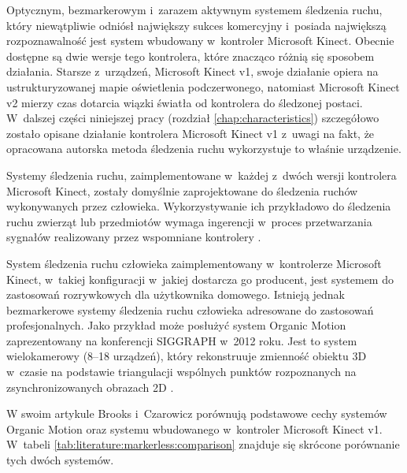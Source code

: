 Optycznym, bezmarkerowym i~zarazem aktywnym systemem śledzenia ruchu, który niewątpliwie odniósł największy sukces komercyjny i~posiada największą rozpoznawalność jest system wbudowany w~kontroler Microsoft Kinect. Obecnie dostępne są dwie wersje tego kontrolera, które znacząco różnią się sposobem działania. Starsze z~urządzeń, Microsoft Kinect v1, swoje działanie opiera na ustrukturyzowanej mapie oświetlenia podczerwonego, natomiast Microsoft Kinect v2 mierzy czas dotarcia wiązki światła od kontrolera do śledzonej postaci. W~dalszej części niniejszej pracy (rozdział \ref{chap:characteristics}) szczegółowo zostało opisane działanie kontrolera Microsoft Kinect v1 z~uwagi na fakt, że opracowana autorska metoda śledzenia ruchu wykorzystuje to właśnie urządzenie. 

Systemy śledzenia ruchu, zaimplementowane w~każdej z~dwóch wersji kontrolera Microsoft Kinect, zostały domyślnie zaprojektowane do śledzenia ruchów wykonywanych przez człowieka. Wykorzystywanie ich przykładowo do śledzenia ruchu zwierząt lub przedmiotów wymaga ingerencji w~proces przetwarzania sygnałów realizowany przez wspomniane kontrolery \cite{Nirjon2012}.

System śledzenia ruchu człowieka zaimplementowany w~kontrolerze Microsoft Kinect, w~takiej konfiguracji w~jakiej dostarcza go producent, jest systemem do zastosowań rozrywkowych dla użytkownika domowego. Istnieją jednak bezmarkerowe systemy śledzenia ruchu człowieka adresowane do zastosowań profesjonalnych. Jako przykład może posłużyć system Organic Motion zaprezentowany na konferencji SIGGRAPH w~2012 roku. Jest to system wielokamerowy (8--18 urządzeń), który rekonstruuje zmienność obiektu 3D w~czasie na podstawie triangulacji wspólnych punktów rozpoznanych na zsynchronizowanych obrazach 2D \cite{Brooks2012}.

W swoim artykule Brooks i~Czarowicz \cite{Brooks2012} porównują podstawowe cechy systemów Organic Motion oraz systemu wbudowanego w~kontroler Microsoft Kinect v1. W~tabeli \ref{tab:literature:markerless:comparison} znajduje się skrócone porównanie tych dwóch systemów. 

